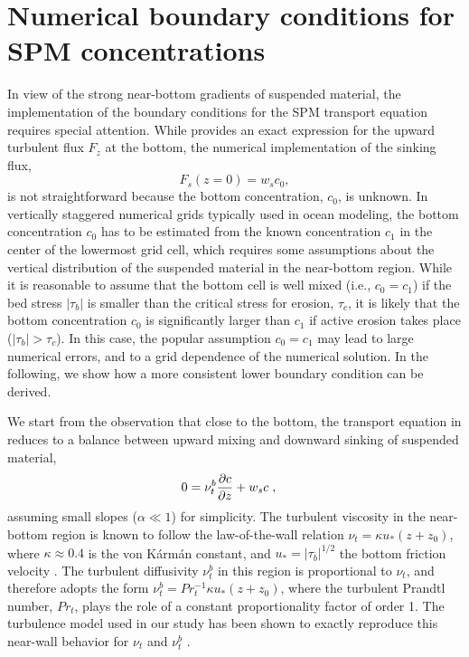 \chapter{Numerical boundary conditions for SPM concentrations}

In view of the strong near-bottom gradients of suspended material, the
implementation of the boundary conditions for the SPM transport
equation  requires special attention. While  provides
an exact expression for the upward turbulent flux $F_z$ at the bottom,
the numerical implementation of the sinking flux,
\begin{equation}
 \label{Fs}
 F_s(z=0) = w_s c_0 \comma
\end{equation}
is not straightforward because the bottom concentration, $c_0$, is
unknown. In vertically staggered numerical grids typically used in
ocean modeling, the bottom concentration $c_0$ has to be estimated
from the known concentration $c_1$ in the center of the lowermost grid
cell, which requires some assumptions about the vertical distribution
of the suspended material in the near-bottom region. While it is
reasonable to assume that the bottom cell is well mixed (i.e.,
$c_0=c_1$) if the bed stress $|\tau_b|$ is smaller than the critical
stress for erosion, $\tau_c$, it is likely that the bottom
concentration $c_0$ is significantly larger than $c_1$ if active
erosion takes place ($|\tau_b| > \tau_c$). In this case, the popular
assumption $c_0=c_1$ may lead to large numerical errors, and to a grid
dependence of the numerical solution. In the following, we show how a
more consistent lower boundary condition can be derived.

We start from the observation that close to the bottom, the transport
equation in  reduces to a balance between upward mixing and
downward sinking of suspended material,
\begin{equation}
 \label{cstationary}
 0 = \nu_t^b \dfrac{\partial {c}}{\partial {z}} + w_s c
 \; , \quad
\end{equation}
assuming small slopes ($\alpha \ll 1$) for simplicity. The turbulent
viscosity in the near-bottom region is known to follow the
law-of-the-wall relation $\nu_t = \kappa u_\ast (z + z_0)$, where
$\kappa \approx 0.4$ is the von K{\'a}rm{\'a}n constant, and $u_\ast =
|\tau_b|^{1/2}$ the bottom friction velocity
\citep[e.g.,][]{Pope2000a}. The turbulent diffusivity $\nu_t^b$ in this
region is proportional to $\nu_t$, and therefore adopts the form
$\nu_t^b = Pr_t^{-1} \kappa u_\ast (z + z_0)$, where the turbulent
Prandtl number, $Pr_t$, plays the role of a constant proportionality
factor of order 1. The turbulence model used in our study has been shown to
exactly reproduce this near-wall behavior for $\nu_t$ and $\nu_t^b$
\citep[e.g., ][]{UmlaufBurchard2003a,UmlaufBurchard2005a}.

